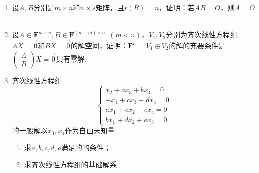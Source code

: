\begin{enumerate}
    \item 设$A,B$分别是$m \times n$和$n \times s$矩阵，且$r(B)=n$，证明：若$AB=O$，则$A=O$.

    \item 设$A \in \mathbf{F}^{m \times n},B \in \mathbf{F}^{(n-m) \times n}\enspace(m<n)$，$V_1,V_2$分别为齐次线性方程组$AX=\vec{0}$和$BX=\vec{0}$的解空间，证明：$\mathbf{F}^n=V_1\oplus V_2$的解的充要条件是$\begin{pmatrix} A \\ B \end{pmatrix}X=\vec{0}$只有零解.

    \item 齐次线性方程组\[\begin{cases}
                  x_2+ax_3+bx_4=0  \\
                  -x_1+cx_3+dx_4=0 \\
                  ax_1+cx_2-ex_4=0 \\
                  bx_1+dx_2+ex_3=0
              \end{cases}\]的一般解以$x_3,x_4$作为自由未知量.
          \begin{enumerate}
              \item 求$a,b,c,d,e$满足的的条件；

              \item 求齐次线性方程组的基础解系.
          \end{enumerate}
\end{enumerate}

